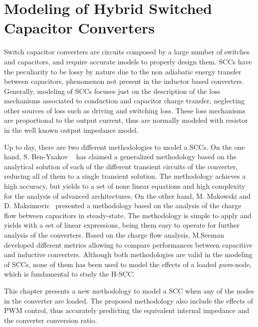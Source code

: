 \chapter[Modeling of H-SCC]{Modeling of Hybrid Switched Capacitor Converters}

Switch capacitor converters are circuits composed by a large number of switches and capacitors, and require accurate models to properly design them. SCCs have the peculiarity to be lossy by nature due to the non adiabatic energy transfer between capacitors, phenomenon not present in the inductor based converters. Generally, modeling of SCCs focuses just on  the description of the loss mechanisms associated to conduction and capacitor charge transfer, neglecting other sources of loss such as driving and switching loss. These loss mechanisms are proportional to the output current, thus are normally modeled with resistor in the well known output impedance model. 

Up to day, there are two different methodologies to model a SCCs. On the one hand, S. Ben-Yaakov  ~\cite{2009Ben-Yaakov,2012Ben-Yaakov,2013Evzelman} has claimed a generalized methodology based on the analytical solution of each of the different transient circuits of the converter, reducing all of them to a single transient solution. The methodology achieves a high accuracy, but yields to a set of none linear equations and high complexity for the analysis of advanced architectures. On the other hand,  M. Makowski and D. Maksimovic~\cite{95Makowski} presented a methodology based on the analysis of the charge flow between capacitors in steady-state. The methodology is simple to apply and yields with a set of linear expressions, being them easy to operate for further analysis of the converters. Based on the charge flow analysis, M.Seeman~\cite{Seeman:EECS-2009-78} developed different metrics allowing to compare performances between capacitive and inductive converters.  Although both methodologies are valid in the modeling of SCCs, none of them has been used to model the effects of a loaded \emph{pwm}-node, which is fundamental to study the H-SCC.

This chapter presents a new methodology to model a SCC when any of the nodes in the converter are loaded. The proposed methodology also include the effects of PWM control, thus accurately predicting the equivalent internal impedance and the converter conversion ratio.  

